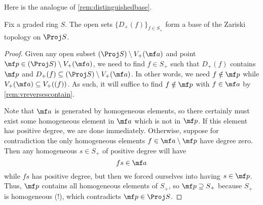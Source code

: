 \documentclass[../notes.tex]{subfiles}
\begin{document}
Here is the analogue of \autoref{rem:distinguishedbase}.
\begin{lemma}
	Fix a graded ring $S$. The open sets $\{D_+(f)\}_{f\in S_+}$ form a base of the Zariski topology on $\Proj S$.
\end{lemma}
\begin{proof}
	Given any open subset $(\Proj S)\setminus V_+(\mf a)$ and point $\mf p\in(\Proj S)\setminus V_+(\mf a)$, we need to find $f\in S_+$ such that $D_+(f)$ contains $\mf p$ and $D_+(f)\subseteq(\Proj S)\setminus V_+(\mf a)$. In other words, we need $f\notin\mf p$ while $V_+(\mf a)\subseteq V_+((f))$. As such, it will suffice to find $f\notin\mf p$ with $f\in\mf a$ by \autoref{rem:vreversescontain}.

	Note that $\mf a$ is generated by homogeneous elements, so there certainly must exist some homogeneous element in $\mf a$ which is not in $\mf p$. If this element has positive degree, we are done immediately. Otherwise, suppose for contradiction the only homogeneous elements $f\in\mf a\setminus\mf p$ have degree zero. Then any homogeneous $s\in S_+$ of positive degree will have
	\[fs\in\mf a\]
	while $fs$ has positive degree, but then we forced ourselves into having $s\in\mf p$. Thus, $\mf p$ contains all homogeneous elements of $S_+$, so $\mf p\supseteq S_+$ because $S_+$ is homogeneous (!), which contradicts $\mf p\in\Proj S$.
\end{proof}
\end{document}

